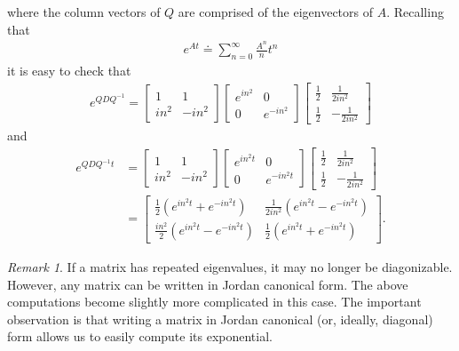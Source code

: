 \documentclass[12pt,reqno]{amsart}
\numberwithin{equation}{section}  %
\numberwithin{figure}{section}
\theoremstyle{plain}
\theoremstyle{definition}
\theoremstyle{remark}
\newtheorem{remark}{Remark}
\begin{document}
%
%
where the column vectors of $Q$ are comprised of the eigenvectors of $A$.
Recalling that 
%
%
\begin{equation*}
\begin{split}
  e^{At} \doteq \sum_{n=0}^{\infty} \frac{A^{n}}{n}t^{n}
\end{split}
\end{equation*}
%
%
it is easy to check that 
%
%
\begin{equation*}
\begin{split}
  e^{Q D Q^{-1}} = 
\begin{bmatrix}
  1 & 1
  \\
  in^{2} & -in^{2}
  \end{bmatrix}
  \begin{bmatrix}
    e^{in^{2}} & 0 
    \\
    0 & e^{-in^{2}}
  \end{bmatrix}
  \begin{bmatrix}
    \frac{1}{2} & \frac{1}{2i n^{2}} \\
    \frac{1}{2} & -\frac{1}{2i n^{2} }
  \end{bmatrix}
\end{split}
\end{equation*}
%
%
and 
\begin{equation}
  \label{matrix-expo}
\begin{split}
  e^{Q D Q^{-1}t}
  & = 
\begin{bmatrix}
  1 & 1
  \\
  in^{2} & -in^{2}
  \end{bmatrix}
  \begin{bmatrix}
    e^{in^{2}t} & 0 
    \\
    0 & e^{-in^{2}t}
  \end{bmatrix}
\begin{bmatrix}
    \frac{1}{2} & \frac{1}{2i n^{2}} \\
    \frac{1}{2} & -\frac{1}{2i n^{2} }
  \end{bmatrix}
  \\
  & =
  \begin{bmatrix}
    \frac{1}{2}(e^{in^{2}t} + e^{-in^{2}t}) & \frac{1}{2 i n^{2}} (e^{in^{2}t} -
    e^{-in^{2}t})    \\
    \frac{in^{2}}{2}(e^{in^{2}t} - e^{-in^{2}t}) & \frac{1}{2}(e^{in^{2}t} +
    e^{-in^{2}t})
  \end{bmatrix}.
\end{split}
\end{equation}
%
%
\begin{framed}
\begin{remark}
If a matrix has repeated eigenvalues, it may no longer be diagonizable. However,
any matrix can be written in Jordan canonical form. The above computations
become slightly more complicated in this case. The important observation is that
writing a matrix in Jordan canonical (or, ideally, diagonal) form allows us to
easily compute its exponential. 
\label{rem:jordan-form}
\end{remark}
\end{framed}
\end{document}
